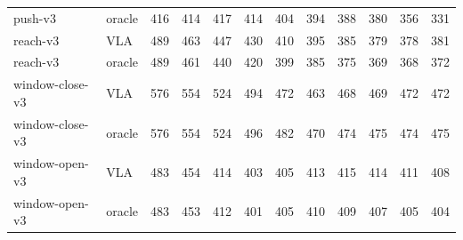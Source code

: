 \begin{center}
\begin{tabular}{llrrrrrrrrrr}
push-v3 & oracle & 416 & 414 & 417 & 414 & 404 & 394 & 388 & 380 & 356 & 331 \\
reach-v3 & VLA & 489 & 463 & 447 & 430 & 410 & 395 & 385 & 379 & 378 & 381 \\
reach-v3 & oracle & 489 & 461 & 440 & 420 & 399 & 385 & 375 & 369 & 368 & 372 \\
window-close-v3 & VLA & 576 & 554 & 524 & 494 & 472 & 463 & 468 & 469 & 472 & 472 \\
window-close-v3 & oracle & 576 & 554 & 524 & 496 & 482 & 470 & 474 & 475 & 474 & 475 \\
window-open-v3 & VLA & 483 & 454 & 414 & 403 & 405 & 413 & 415 & 414 & 411 & 408 \\
window-open-v3 & oracle & 483 & 453 & 412 & 401 & 405 & 410 & 409 & 407 & 405 & 404 \\
\hline
\end{tabular}
\end{center}
